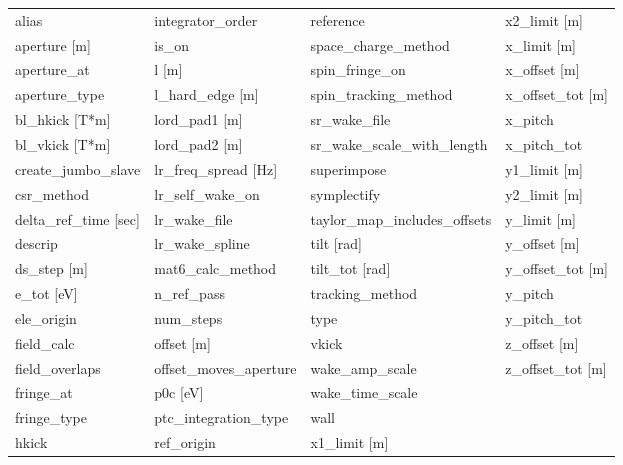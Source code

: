  \begin{tabular}{llll} \toprule
alias                          & integrator_order               & reference                      & x2_limit [m]                   \\
aperture [m]                   & is_on                          & space_charge_method            & x_limit [m]                    \\
aperture_at                    & l [m]                          & spin_fringe_on                 & x_offset [m]                   \\
aperture_type                  & l_hard_edge [m]                & spin_tracking_method           & x_offset_tot [m]               \\
bl_hkick [T*m]                 & lord_pad1 [m]                  & sr_wake_file                   & x_pitch                        \\
bl_vkick [T*m]                 & lord_pad2 [m]                  & sr_wake_scale_with_length      & x_pitch_tot                    \\
create_jumbo_slave             & lr_freq_spread [Hz]            & superimpose                    & y1_limit [m]                   \\
csr_method                     & lr_self_wake_on                & symplectify                    & y2_limit [m]                   \\
delta_ref_time [sec]           & lr_wake_file                   & taylor_map_includes_offsets    & y_limit [m]                    \\
descrip                        & lr_wake_spline                 & tilt [rad]                     & y_offset [m]                   \\
ds_step [m]                    & mat6_calc_method               & tilt_tot [rad]                 & y_offset_tot [m]               \\
e_tot [eV]                     & n_ref_pass                     & tracking_method                & y_pitch                        \\
ele_origin                     & num_steps                      & type                           & y_pitch_tot                    \\
field_calc                     & offset [m]                     & vkick                          & z_offset [m]                   \\
field_overlaps                 & offset_moves_aperture          & wake_amp_scale                 & z_offset_tot [m]               \\
fringe_at                      & p0c [eV]                       & wake_time_scale                &                                \\
fringe_type                    & ptc_integration_type           & wall                           &                                \\
hkick                          & ref_origin                     & x1_limit [m]                   &                                \\
 \bottomrule
 \end{tabular}
 \vfill
 
